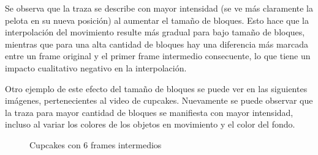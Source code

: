 \par Se observa que la traza se describe con mayor intensidad (se ve m\'as claramente la pelota en su nueva posici\'on) al aumentar el tama\~no de bloques.
Esto hace que la interpolaci\'on del movimiento resulte m\'as gradual para bajo tama\~no de bloques, mientras que para una alta cantidad de bloques hay una diferencia m\'as marcada entre un frame original y el primer frame intermedio consecuente, lo que tiene un impacto cualitativo negativo en la interpolaci\'on.
\par Otro ejemplo de este efecto del tama\~no de bloques se puede ver en las siguientes im\'agenes, pertenecientes al video de cupcakes.
Nuevamente se puede observar que la traza para mayor cantidad de bloques se manifiesta con mayor intensidad, incluso al variar los colores de los objetos en movimiento y el color del fondo.

\FloatBarrier
\begin{figure}
\hfill
{}
\hfill
{}
\hfill
\caption{Cupcakes con 6 frames intermedios}
\end{figure}
\FloatBarrier

